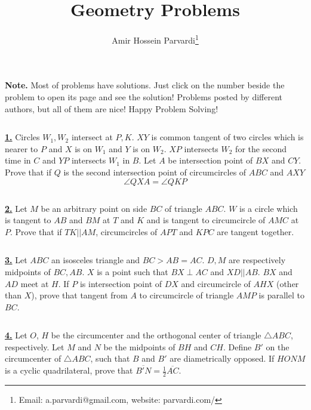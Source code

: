 \documentclass{article}
\begin{document}
\title{Geometry Problems}\author{Amir Hossein Parvardi\thanks{ Email: a.parvardi@gmail.com, website: parvardi.com/ }} \maketitle

\par {\bf Note.} Most of problems have solutions. Just click on the number beside the problem to open its page and see the solution! Problems posted by different authors, but all of them are nice! Happy Problem Solving!

$$ $$

\href{http://www.artofproblemsolving.com/Forum/viewtopic.php?p=1899886#p1899886}{\bf 1.} Circles $W_1,W_2$ intersect at $P,K$. $XY$ is common tangent of two circles which is nearer to $P$ and $X$ is on $W_1$ and $Y$ is on $W_2$. $XP$ intersects $W_2$ for the second time in $C$ and $YP$ intersects $W_1$ in $B$. Let $A$ be intersection point of $BX$ and $CY$. Prove that if $Q$ is the second intersection point of circumcircles of $ABC$ and $AXY$
$$\angle QXA=\angle QKP$$

$$ $$

\href{http://www.artofproblemsolving.com/Forum/viewtopic.php?p=1899885#p1899885}{\bf 2.} Let $M$ be an arbitrary point on side $BC$ of triangle $ABC$. $W$ is a circle which is tangent to $AB$ and $BM$ at $T$ and $K$ and is tangent to circumcircle of $AMC$ at $P$. Prove that if $TK||AM$, circumcircles of $APT$ and $KPC$ are tangent together.

$$ $$

\href{http://www.artofproblemsolving.com/Forum/viewtopic.php?p=1871430#p1871430}{\bf 3.} Let $ABC$ an isosceles triangle and $BC>AB=AC$. $D,M$ are respectively midpoints of $BC, AB$. $X$ is a point such that $BX\perp AC$ and $XD||AB$. $BX$ and $AD$ meet at $H$. If $P$ is intersection point of $DX$ and circumcircle of $AHX$ (other than $X$), prove that tangent from $A$ to circumcircle of triangle $AMP$ is parallel to $BC$.

$$ $$

\href{http://www.artofproblemsolving.com/Forum/viewtopic.php?p=1871420#p1871420}{\bf 4.} Let $O$, $H$ be the circumcenter and the orthogonal center of triangle $\triangle ABC$, respectively. Let $M$ and $N$ be the midpoints of $BH$ and $CH$. Define $B'$ on the circumcenter of $\triangle ABC$, such that $B$ and $B'$ are diametrically opposed. If $HONM$ is a cyclic quadrilateral, prove that $\overline{B'N}=\frac12\overline{AC}$.
\end{document}
